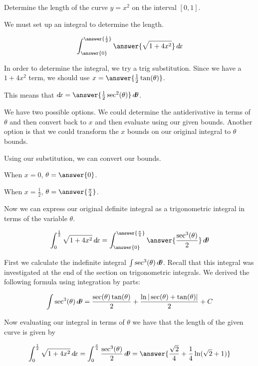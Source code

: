 \documentclass{ximera}
\author{Jason Miller}
\begin{document}
\begin{exercise}
Determine the length of the curve $y=x^{2}$ on the interval $[0,1]$. 

We must set up an integral to determine the length. 

\[
\int_{\answer{0}}^{\answer{\frac{1}{2}}} \answer{ \sqrt{1+4x^{2}}} \d x
\]

\begin{exercise}

In order to determine the integral, we try a trig substitution.
Since we have a $1+4x^{2}$ term, we should use $x=\answer{\frac{1}{2}\tan(\theta)}$. 

This means that $\d x= \answer{ \frac{1}{2}\sec^{2}(\theta)} \d \theta$. 

We have two possible options. We could determine the antiderivative in terms of $\theta$ 
and then convert back to $x$ and then evaluate using our given bounds. 
Another option is that we could transform the $x$ bounds on our original integral to $\theta$ bounds. 

Using our substitution, we can convert our bounds.

When $x=0$, $\theta=\answer{0}$. 

When $x=\frac{1}{2}$, $\theta=\answer{\frac{\pi}{4}}$. 



\begin{exercise}


Now we can express our original definite integral as a trigonometric integral in terms of the variable $\theta$. 

\[
\int_{0}^{\frac{1}{2}} \sqrt{1+4x^{2}} \d x= \int_{\answer{0}}^{\answer{\frac{\pi}{4}}}  \answer{\frac{\sec^{3}(\theta)}{2}}   \d \theta
\]


First we calculate the indefinite integral $\int \sec^{3}(\theta) \mathop{}\!d\! \theta$. Recall that this integral was investigated at the end of the section on trigonometric integrals. 
We derived the following formula using integration by parts:

\[
\int \sec^{3}(\theta) \mathop{}\!d\! \theta=\frac{\sec(\theta)\tan(\theta)}{2} + \frac{ \ln| \sec(\theta) + \tan(\theta) | }{2} + C
\]

\begin{exercise}
Now evaluating our integral in terms of $\theta$ we have that the length of the given curve is given by

\[
\int_{0}^{\frac{1}{2}} \sqrt{1+4x^{2}} \d x= \int_{0}^{\frac{\pi}{4}}  \frac{\sec^{3}(\theta)}{2}   \d \theta =\answer{\frac{\sqrt{2}}{4} + \frac{1}{4}\ln(\sqrt{2}+1) }
\]




\end{exercise}
\end{exercise}

\end{exercise}

\end{exercise}
\end{document}
